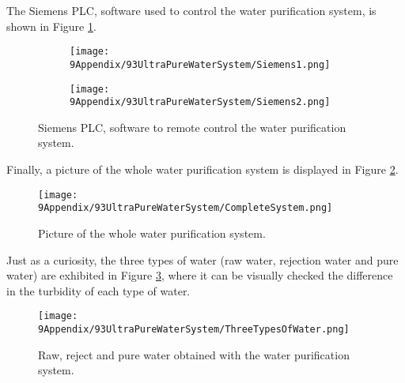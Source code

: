 The Siemens PLC, software used to control the water purification system, is shown in Figure \ref{fig:Siemens}.

\begin{figure}
\centering
    \begin{subfigure}[b]{0.6\textwidth}
    \centering
    \texttt{[image: 9Appendix/93UltraPureWaterSystem/Siemens1.png]}  
    \caption{}
    \end{subfigure}
    \hfill
    \begin{subfigure}[b]{0.6\textwidth}
    \centering
    \texttt{[image: 9Appendix/93UltraPureWaterSystem/Siemens2.png]}  
    \caption{}
    \end{subfigure}
 \caption{Siemens PLC, software to remote control the water purification system.}
 \label{fig:Siemens}
\end{figure}

Finally, a picture of the whole water purification system is displayed in Figure \ref{fig:CompleteSystem}.

\begin{figure}[htbp]
\centering
\texttt{[image: 9Appendix/93UltraPureWaterSystem/CompleteSystem.png]}
\caption{Picture of the whole water purification system.\label{fig:CompleteSystem}}
\end{figure}

Just as a curiosity, the three types of water (raw water, rejection water and pure water) are exhibited in Figure \ref{fig:ThreeTypesOfWater}, where it can be visually checked the difference in the turbidity of each type of water.

\begin{figure}[htbp]
\centering
\texttt{[image: 9Appendix/93UltraPureWaterSystem/ThreeTypesOfWater.png]}
\caption{Raw, reject and pure water obtained with the water purification system.\label{fig:ThreeTypesOfWater}}
\end{figure}